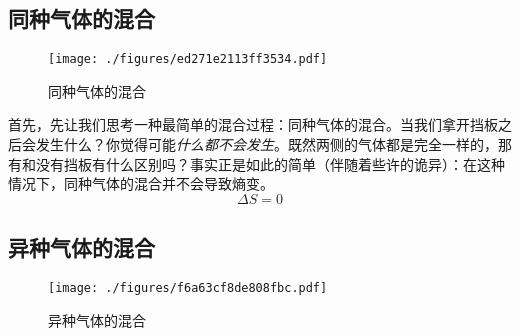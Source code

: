 

\begin{issues}
\issueDraft
\end{issues}

\subsection{同种气体的混合}
\begin{figure}[ht]
\centering
\texttt{[image: ./figures/ed271e2113ff3534.pdf]}
\caption{同种气体的混合} \label{fig_IGME_1}
\end{figure}
首先，先让我们思考一种最简单的混合过程：同种气体的混合。当我们拿开挡板之后会发生什么？你觉得可能\textsl{什么都不会发生}。既然两侧的气体都是完全一样的，那有和没有挡板有什么区别吗？事实正是如此的简单（伴随着些许的诡异）：在这种情况下，同种气体的混合并不会导致熵变。
\begin{equation}
\Delta S = 0
\end{equation}

\subsection{异种气体的混合}
\begin{figure}[ht]
\centering
\texttt{[image: ./figures/f6a63cf8de808fbc.pdf]}
\caption{异种气体的混合 } \label{fig_IGME_fig2}
\end{figure}